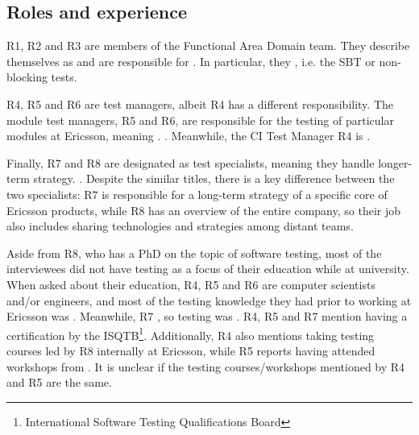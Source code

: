 \subsection{Roles and experience}

R1, R2 and R3 are members of the Functional Area Domain team.
They describe themselves as  and are responsible for .
In particular, they , i.e. the SBT or non-blocking tests.

R4, R5 and R6 are test managers, albeit R4 has a different responsibility.
The module test managers, R5 and R6, are responsible for the testing of particular modules at Ericsson, meaning .
.
Meanwhile, the CI Test Manager R4 is .

Finally, R7 and R8 are designated as test specialists, meaning they handle longer-term strategy.
.
Despite the similar titles, there is a key difference between the two specialists: R7 is responsible for a long-term strategy of a specific core of Ericsson products, while R8 has an overview of the entire company, so their job also includes sharing technologies and strategies among distant teams.

Aside from R8, who has a PhD on the topic of software testing, most of the interviewees did not have testing as a focus of their education while at university.
When asked about their education, R4, R5 and R6 are computer scientists and/or engineers, and most of the testing knowledge they had prior to working at Ericsson was .
Meanwhile, R7 , so testing was .
R4, R5 and R7 mention having a certification by the ISQTB\footnote{International Software Testing Qualifications Board}.
Additionally, R4 also mentions taking testing courses led by R8 internally at Ericsson, while R5 reports having attended workshops from .
It is unclear if the testing courses/workshops mentioned by R4 and R5 are the same.

